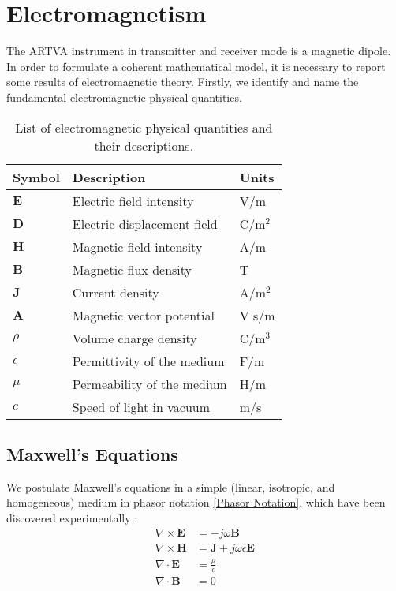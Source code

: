 \chapter{Electromagnetism}
The ARTVA instrument in transmitter and receiver mode  is a magnetic dipole. In order to formulate a coherent mathematical model, it is necessary to report some results of electromagnetic theory. Firstly, we identify and name the fundamental electromagnetic physical quantities. 
\begin{table}[h!]
    \centering
    \begin{tabular}{lll}
        \hline
        Symbol & Description & Units \\
        \hline
        $\mathbf{E}$ & Electric field intensity & V/m \\
        $\mathbf{D}$ & Electric displacement field & C/m$^2$ \\
        $\mathbf{H}$ & Magnetic field intensity & A/m \\
        $\mathbf{B}$ & Magnetic flux density & T \\
        $\mathbf{J}$ & Current density & A/m$^2$ \\
        $\mathbf{A}$ & Magnetic vector potential & V s/m\\
        $\rho$ & Volume charge density & C/m$^3$ \\
        $\epsilon$ & Permittivity of the medium & F/m \\
        $\mu$ & Permeability of the medium & H/m \\
        $c$ & Speed of light in vacuum & m/s \\
        \hline
    \end{tabular}
    \caption{List of electromagnetic physical quantities and their descriptions.}
    \label{tab:symbols}
\end{table}

\section{Maxwell's Equations}
We postulate Maxwell's equations in a simple (linear, isotropic, and homogeneous) medium in phasor notation \ref{Phasor Notation}, which have been discovered experimentally \cite{book-magnetism}:
\begin{align}
\nabla \times \mathbf{E} &= -j\omega \mathbf{B} \label{eq:curl_E} \\
\nabla \times \mathbf{H} &= \mathbf{J} + j\omega \epsilon \mathbf{E} \label{eq:curl_H} \\
\nabla \cdot \mathbf{E} &= \frac{\rho}{\epsilon} \label{eq:E} \\
\nabla \cdot {\mathbf{B}} &= 0 \label{eq:B}
\end{align}

